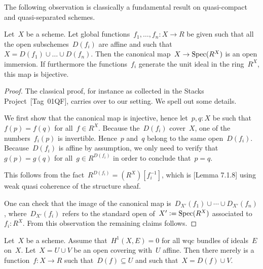 


The following observation is classically a fundamental result on quasi-compact
and quasi-separated schemes.

\begin{lemma}\label{enough-functions-affine}
  Let~$X$ be a scheme. Let global functions~$f_1,\ldots,f_n : X \to R$ be given
  such that all the open subschemes~$D(f_i)$ are affine and such that~$X =
  D(f_1) \cup \ldots \cup D(f_n)$. Then the canonical map~$X \to \operatorname{Spec}(R^X)$ is
  an open immersion. If furthermore the functions~$f_i$ generate the unit ideal
  in the ring~$R^X$, this map is bijective.
\end{lemma}

\begin{proof}
  The classical proof, for instance as collected in the Stacks
  Project~\cite{stacks}[Tag~01QF], carries over to our setting. We spell out
  some details.

  We first show that the canonical map is injective, hence let~$p,q : X$ be such
  that~$f(p) = f(q)$ for all~$f \in R^X$. Because the~$D(f_i)$ cover~$X$, one
  of the numbers~$f_i(p)$ is invertible. Hence~$p$ and~$q$ belong to the same
  open~$D(f_i)$. Because~$D(f_i)$ is affine by assumption, we only need to
  verify that~$g(p) = g(q)$ for all~$g \in R^{D(f_i)}$ in order to conclude
  that~$p = q$.

  This follows from the fact~$R^{D(f_i)} = (R^X)[f_i^{-1}]$,
  which is \cite{draft}[Lemma 7.1.8] using weak quasi coherence of the structure sheaf.
  One can check that the image of the canonical map is~$D_{X'}(f_1) \cup \cdots
  \cup D_{X'}(f_n)$, where~$D_{X'}(f_i)$ refers to the standard open of~$X'
  \vcentcolon= \operatorname{Spec}(R^X)$ associated to~$f_i : R^X$. From this observation the
  remaining claims follows.
\end{proof}


\begin{lemma}\label{serre-workhorse}
  Let~$X$ be a scheme. Assume that~$H^1(X, E) = 0$ for all wqc bundles of ideals~$E$
  on~$X$. Let~$X = U \cup V$ be an open covering with~$U$ affine. Then there
  merely is a function~$f : X \to R$ such that~$D(f) \subseteq U$ and such
  that~$X = D(f) \cup V$.
\end{lemma}

